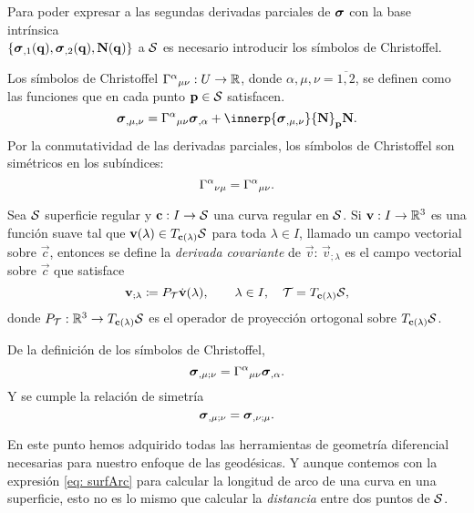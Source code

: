 Para poder expresar a las segundas derivadas parciales de $\boldsymbol{\sigma}$ con la base intrínsica\\ $\{\boldsymbol{\sigma}_{,1}(\mathbf q), \boldsymbol{\sigma}_{,2}(\mathbf q), \mathbf N(\mathbf q)\}$ a $\mathcal S$ es necesario introducir los símbolos de Christoffel.
\begin{definition}
	Los símbolos de Christoffel ${\Gamma^{\alpha}}_{\mu\nu} : U \to \mathbb R$, donde $\alpha, \mu,\nu = \overline{1,2}$, se definen como las funciones que en cada punto $\mathbf p \in \mathcal S$ satisfacen.
	\begin{equation}
		\patch_{,\mu,\nu} = \ChrisSym{\alpha}{\mu\nu} \patch_{,\alpha} + \innerp{\patch_{,\mu,\nu}}{\vec N}_\vec{p}\vec N.
	\end{equation}
	Por la conmutatividad de las derivadas parciales, los símbolos de Christoffel son simétricos en los subíndices:
	\begin{equation}
		{\Gamma^{\alpha}}_{\nu\mu} = {\Gamma^{\alpha}}_{\mu\nu}.
	\end{equation}
\end{definition}
\begin{definition}
	Sea $\mathcal S$ superficie regular y $\mathbf c: I \to \mathcal S$ una curva regular en $\mathcal S$. Si $\mathbf v : I \to \mathbb R^3$ es una función suave tal que $\mathbf v(\lambda) \in T_{\mathbf c(\lambda)}\mathcal S$ para toda $\lambda \in I$, llamado un campo vectorial sobre $\vec c$, entonces se define la \emph{derivada covariante} de $\vec v$: $\vec v_{;\lambda}$ es el campo vectorial sobre $\vec c$ que satisface
	\begin{equation}
		\mathbf v_{;\lambda} \coloneqq P_{\mathcal T} \dot{\mathbf v}(\lambda), \qquad \lambda \in I, \quad \mathcal T = T_{\mathbf c(\lambda)}\mathcal S,
	\end{equation}
	donde $P_{\mathcal T} : \mathbb R^3 \to T_{\mathbf c(\lambda)}\mathcal S $ es el operador de proyección ortogonal sobre $T_{\mathbf c(\lambda)}\mathcal S$.
\end{definition}

\begin{remark}
	De la definición de los símbolos de Christoffel,
	\begin{equation}\label{eq: covariant}
		\boldsymbol{\sigma}_{,\mu;\nu} = {\Gamma^{\alpha}}_{\mu\nu} \boldsymbol{\sigma}_{,\alpha}.
	\end{equation}
	Y se cumple la relación de simetría
	\begin{equation}
		\boldsymbol{\sigma}_{,\mu;\nu} = \boldsymbol{\sigma}_{,\nu;\mu}.
	\end{equation}
\end{remark}

En este punto hemos adquirido todas las herramientas de geometría diferencial necesarias para nuestro enfoque de las geodésicas. Y aunque contemos con la expresión \eqref{eq: surfArc} para calcular la longitud de arco de una curva en una superficie, esto no es lo mismo que calcular la \emph{distancia} entre dos puntos de $\mathcal S$.